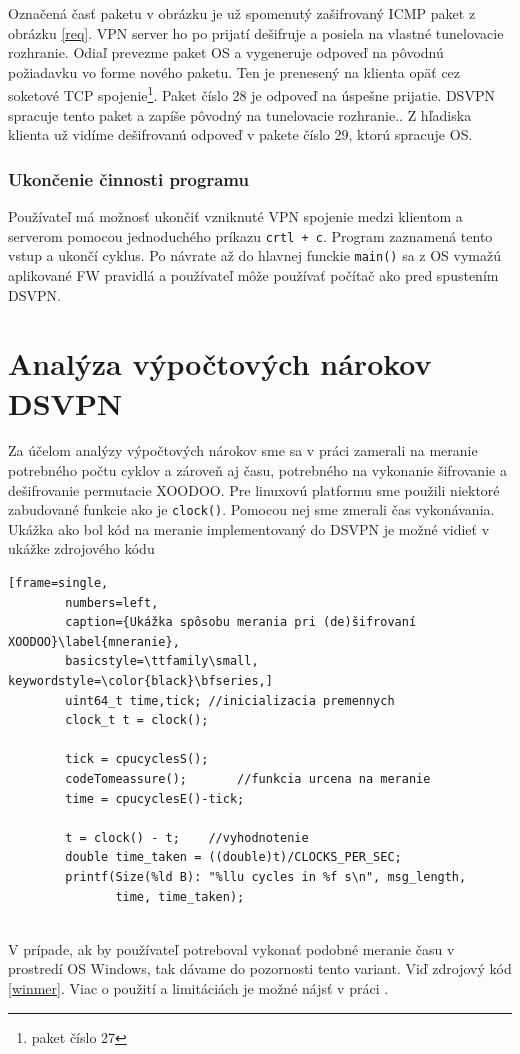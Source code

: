 Označená časť paketu v obrázku je už spomenutý zašifrovaný ICMP paket z obrázku \ref{req}. VPN server ho po prijatí dešifruje a posiela na vlastné tunelovacie rozhranie. Odiaľ prevezme paket OS a vygeneruje odpoveď na pôvodnú požiadavku vo forme nového paketu. Ten je prenesený na klienta opäť cez soketové TCP spojenie\footnote{paket číslo 27}. Paket číslo 28 je odpoveď na úspešne prijatie. DSVPN spracuje tento paket a zapíše pôvodný na tunelovacie rozhranie.. Z hľadiska klienta už vidíme dešifrovanú odpoveď v pakete číslo 29, ktorú spracuje OS.

  
\subsubsection{Ukončenie činnosti programu}
Používateľ má možnosť ukončiť vzniknuté VPN spojenie medzi klientom a serverom pomocou jednoduchého príkazu \lstinline|crtl + c|. Program zaznamená tento vstup a ukončí cyklus. Po návrate až do hlavnej funckie \lstinline|main()| sa z OS vymažú aplikované FW pravidlá a používateľ môže používať počítač ako pred spustením DSVPN.

\section{Analýza výpočtových nárokov DSVPN}\label{analyza}
Za účelom analýzy výpočtových nárokov sme sa v práci zamerali na meranie potrebného počtu cyklov a zároveň aj času, potrebného na vykonanie šifrovanie a dešifrovanie permutacie XOODOO. Pre linuxovú platformu sme použili niektoré zabudované funkcie ako je \lstinline|clock()|. Pomocou nej sme zmerali čas vykonávania. Ukážka ako bol kód na meranie implementovaný do DSVPN je možné vidieť v ukážke zdrojového kódu
 
\begin{minipage}{\linewidth} 	
	\begin{lstlisting}[frame=single,
		numbers=left,
		caption={Ukážka spôsobu merania pri (de)šifrovaní XOODOO}\label{mneranie},
		basicstyle=\ttfamily\small, keywordstyle=\color{black}\bfseries,]
		uint64_t time,tick;	//inicializacia premennych
		clock_t t = clock();
		
		tick = cpucyclesS();
		codeTomeassure();		//funkcia urcena na meranie
		time = cpucyclesE()-tick;
		
		t = clock() - t;    //vyhodnotenie
		double time_taken = ((double)t)/CLOCKS_PER_SEC;
		printf(Size(%ld B): "%llu cycles in %f s\n", msg_length,
		       time, time_taken);	
	\end{lstlisting}
\end{minipage}\\
V prípade, ak by používateľ potreboval vykonať podobné meranie času v prostredí OS Windows, tak dávame do pozornosti tento variant. Viď zdrojový kód \ref{winmer}. Viac o použití a limitáciách je možné nájsť v práci \cite{bc}.

